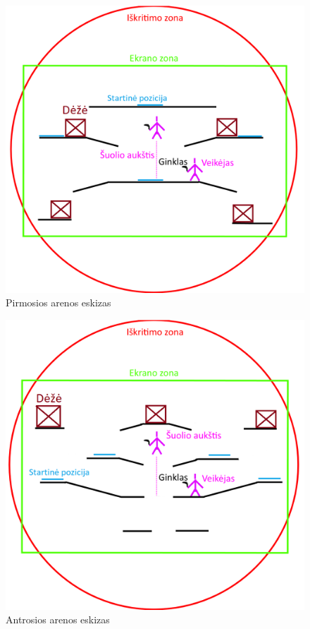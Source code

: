 \documentclass{VUMIFPSkursinis}
\begin{document}
\begin{figure}[H]
    \centering
    \includegraphics[scale=0.4]{img/Arenas/map1.png}
    \caption{Pirmosios arenos eskizas}
    \label{img:map1}
\end{figure}

\begin{figure}[H]
    \centering
    \includegraphics[scale=0.4]{img/Arenas/map2.png}
    \caption{Antrosios arenos eskizas}
    \label{img:map2}
\end{figure}
\end{document}
